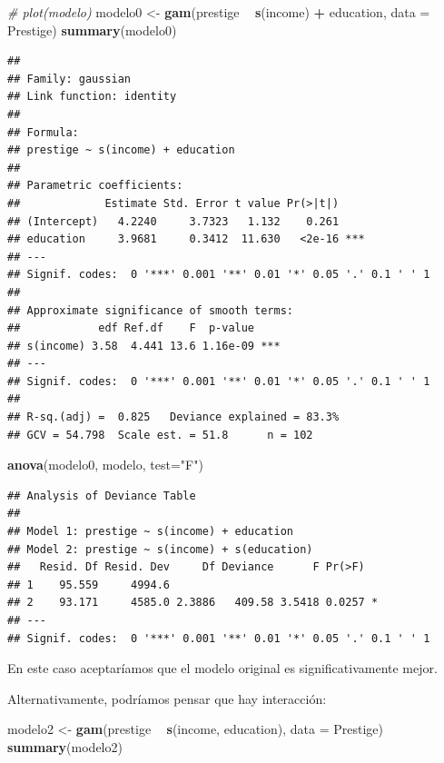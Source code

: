 \documentclass[]{book}
\newenvironment{Shaded}{\begin{snugshade}}{\end{snugshade}}
\newcommand{\KeywordTok}[1]{\textcolor[rgb]{0.13,0.29,0.53}{\textbf{#1}}}
\newcommand{\DataTypeTok}[1]{\textcolor[rgb]{0.13,0.29,0.53}{#1}}
\newcommand{\StringTok}[1]{\textcolor[rgb]{0.31,0.60,0.02}{#1}}
\newcommand{\CommentTok}[1]{\textcolor[rgb]{0.56,0.35,0.01}{\textit{#1}}}
\newcommand{\OperatorTok}[1]{\textcolor[rgb]{0.81,0.36,0.00}{\textbf{#1}}}
\newcommand{\NormalTok}[1]{#1}
\begin{document}
\begin{Shaded}
\begin{Highlighting}[]
\CommentTok{# plot(modelo)}
\NormalTok{modelo0 <-}\StringTok{ }\KeywordTok{gam}\NormalTok{(prestige }\OperatorTok{~}\StringTok{ }\KeywordTok{s}\NormalTok{(income) }\OperatorTok{+}\StringTok{ }\NormalTok{education, }\DataTypeTok{data =}\NormalTok{ Prestige)}
\KeywordTok{summary}\NormalTok{(modelo0)}
\end{Highlighting}
\end{Shaded}

\begin{verbatim}
## 
## Family: gaussian 
## Link function: identity 
## 
## Formula:
## prestige ~ s(income) + education
## 
## Parametric coefficients:
##             Estimate Std. Error t value Pr(>|t|)    
## (Intercept)   4.2240     3.7323   1.132    0.261    
## education     3.9681     0.3412  11.630   <2e-16 ***
## ---
## Signif. codes:  0 '***' 0.001 '**' 0.01 '*' 0.05 '.' 0.1 ' ' 1
## 
## Approximate significance of smooth terms:
##            edf Ref.df    F  p-value    
## s(income) 3.58  4.441 13.6 1.16e-09 ***
## ---
## Signif. codes:  0 '***' 0.001 '**' 0.01 '*' 0.05 '.' 0.1 ' ' 1
## 
## R-sq.(adj) =  0.825   Deviance explained = 83.3%
## GCV = 54.798  Scale est. = 51.8      n = 102
\end{verbatim}

\begin{Shaded}
\begin{Highlighting}[]
\KeywordTok{anova}\NormalTok{(modelo0, modelo, }\DataTypeTok{test=}\StringTok{"F"}\NormalTok{)}
\end{Highlighting}
\end{Shaded}

\begin{verbatim}
## Analysis of Deviance Table
## 
## Model 1: prestige ~ s(income) + education
## Model 2: prestige ~ s(income) + s(education)
##   Resid. Df Resid. Dev     Df Deviance      F Pr(>F)  
## 1    95.559     4994.6                                
## 2    93.171     4585.0 2.3886   409.58 3.5418 0.0257 *
## ---
## Signif. codes:  0 '***' 0.001 '**' 0.01 '*' 0.05 '.' 0.1 ' ' 1
\end{verbatim}

En este caso aceptaríamos que el modelo original es significativamente
mejor.

Alternativamente, podríamos pensar que hay interacción:

\begin{Shaded}
\begin{Highlighting}[]
\NormalTok{modelo2 <-}\StringTok{ }\KeywordTok{gam}\NormalTok{(prestige }\OperatorTok{~}\StringTok{ }\KeywordTok{s}\NormalTok{(income, education), }\DataTypeTok{data =}\NormalTok{ Prestige)}
\KeywordTok{summary}\NormalTok{(modelo2)}
\end{Highlighting}
\end{Shaded}
\end{document}
